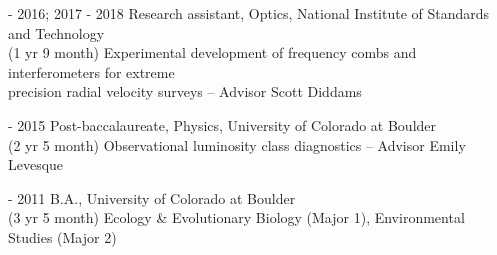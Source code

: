 \documentclass[10pt,preprint]{aastex}
\newcommand*{\xdash}[1][3em]{\rule[0.5ex]{#1}{0.7pt}}
\begin{document}
 - 2016; 2017 - 2018 \-\hspace{.22cm} Research assistant, Optics, National Institute of Standards and Technology\\
(1 yr 9 month) \-\hspace{2.2cm}Experimental development of frequency combs and interferometers for extreme \\ \-\hspace{4.55cm}precision radial velocity surveys -- Advisor Scott Diddams 

 - 2015 \-\hspace{2.2cm} Post-baccalaureate, Physics, University of Colorado at Boulder \\
(2 yr 5 month) \-\hspace{2.1cm}Observational luminosity class diagnostics -- Advisor Emily Levesque

 - 2011 \-\hspace{2.2cm} B.A., University of Colorado at Boulder \\
(3 yr 5 month) \-\hspace{2.1cm}Ecology \& Evolutionary Biology (Major 1), Environmental Studies (Major 2) 





\end{document}
